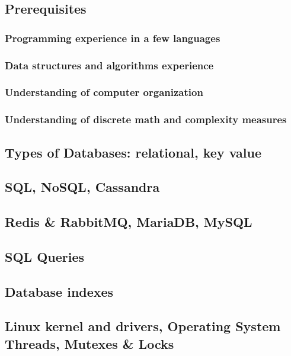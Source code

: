 %
%


\subsection{Prerequisites}

  \subsubsection{Programming experience in a few languages}
  \subsubsection{Data structures and algorithms experience}
  \subsubsection{Understanding of computer organization}
  \subsubsection{Understanding of discrete math and complexity measures}

\subsection{Types of Databases: relational, key value}

\subsection{SQL, NoSQL, Cassandra}

\subsection{Redis \& RabbitMQ, MariaDB, MySQL}

\subsection{SQL Queries}

\subsection{Database indexes}

\subsection{Linux kernel and drivers, Operating System Threads, Mutexes \& Locks}

